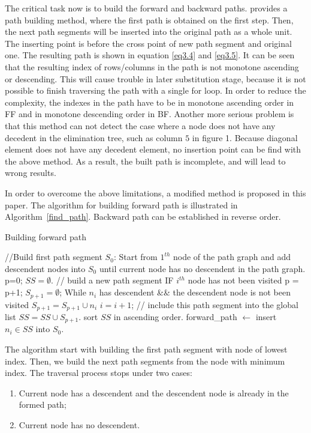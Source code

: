 The critical task now is to build the forward and backward paths. \cite{Tinney} provides a path building method, where the first path is 
obtained on the first step. Then, the next path segments will be inserted into the original path as a whole unit. The inserting point is 
before the cross point of new path segment and original one. The resulting path is shown in equation \eqref{eq3.4} and \eqref{eq3.5}. It
can be seen that the resulting index of rows/columns in the path is not monotone ascending or descending. This will cause trouble in
later substitution stage, because it is not possible to finish traversing the path with a single for loop. In order to reduce the 
complexity, the indexes in the path have to be in monotone ascending order in FF and in monotone descending order in BF. Another more 
serious problem is that this method can not detect the case where a node does not have any decedent in the elimination tree, such as column $5$ in figure 1. Because diagonal element does not have any decedent element, no insertion point can be find with the above method. As a result, the built path is incomplete, and will lead to wrong results. 

In order to overcome the above limitations, a modified method is proposed in this paper. The algorithm for building forward path is illustrated in Algorithm~\ref{find_path}. Backward path can be established in reverse order.
\begin{algorithm}[H]
        \caption{Building forward path}\label{find_path}
	\begin{algorithmic}
		\STATE //Build first path segment $S_0$:
		\STATE Start from $1^{th}$ node of the path graph and add descendent nodes into $S_0$ until current node
				has no descendent in the path graph.\\
		\STATE	p=0; $SS = \emptyset$.
			\STATE // build a new path segment
		    \STATE IF $i^{th}$ node has not been visited
		 		\STATE	p = p+1; $S_{p+1}=\emptyset$;
				\STATE While $n_i$ has descendent \&\& the descendent node is not been visited 
					\STATE	$S_{p+1}=S_{p+1}\cup n_i$
					\STATE	$i=i+1$;
				\STATE // include this path segment into the global list	
				\STATE $SS=SS\cup S_{p+1}$.			
		\ENDFOR 
		\STATE sort $SS$ in ascending order.
		\STATE forward\_path $\leftarrow$ insert $n_i\in SS$ into $S_0$.
	\end{algorithmic}\vspace{10pt}
\end{algorithm}

The algorithm start with building the first path segment with node of lowest index. Then, we build the next path segments from the node with minimum index. The traversal process stops under two cases: 
\begin{enumerate}[1)]
\item Current node has a descendent and the descendent node is already in the formed path; 
\item Current node has no descendent.
\end{enumerate} 

